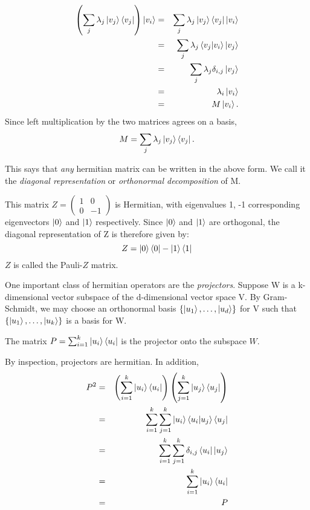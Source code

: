 \begin{eqnarray}
\left(\sum\limits_j \lambda_j\ket{v_j}\bra{v_j}\right)\ket{v_i}&=&\sum\limits_j \lambda_j\ket{v_j}\bra{v_j}\ket{v_i}\\
&=&\sum\limits_j \lambda_j\braket{v_j|v_i}\ket{v_j}\\
&=&\sum\limits_j \lambda_j\delta_{i,j}\ket{v_j}\\
&=&\lambda_i\ket{v_i}\\
&=&M\ket{v_i}.\\
\end{eqnarray}
Since left multiplication by the two matrices agrees on a basis,
\begin{equation}
M=\sum\limits_j \lambda_j \ket{v_j}\bra{v_j}.    
\end{equation}

This says that {\emph{any}} hermitian matrix can be written in the above form. We call it the \textit{diagonal representation} or \textit{orthonormal decomposition} of M.
\begin{example} \label{example-pauli z diagonal rep}
This matrix $Z=\left(\begin{smallmatrix}
    1 & 0\\
    0 & -1
    \end{smallmatrix}\right)$
    is Hermitian, with eigenvalues 1, -1 corresponding eigenvectors $\ket{0}$ and  $\ket{1}$ respectively.  Since $\ket{0}$ and $\ket{1}$ are orthogonal, the diagonal representation of Z is therefore given by:
\begin{equation}
    Z=\ket{0}\bra{0}-\ket{1}\bra{1}
\end{equation}
$Z$ is called the Pauli-$Z$ matrix.
\end{example}

One important class of hermitian operators are the \textit{projectors}. Suppose W is a k-dimensional vector subspace of the d-dimensional vector space V. By Gram-Schmidt, we may choose an orthonormal basis $\{\ket{u_1}, \hdots, \ket{u_d}\}$ for V such that $\{\ket{u_1}, \hdots, \ket{u_k}\}$ is a basis for W.  
\begin{definition}
The matrix $P=\sum_{i=1}^k \ket{u_i} \bra{u_i}$ is the projector onto the subspace $W$.
\end{definition}
By inspection, projectors are hermitian.  In addition,
\begin{eqnarray}
    P^2&=&\left(\sum_{i=1}^k \ket{u_i} \bra{u_i}\right)\left(\sum_{j=1}^k \ket{u_j} \bra{u_j}\right)\\
    &=&\sum_{i=1}^k \sum_{j=1}^k \ket{u_i} \braket{u_i|u_j} \bra{u_j}\\
    &=&\sum_{i=1}^k \sum_{j=1}^k\delta_{i,j}\bra{u_i}\ket{u_j}\\
    &=&\sum_{i=1}^k \ket{u_i} \bra{u_i}\\
    &=&P
    \end{eqnarray}

